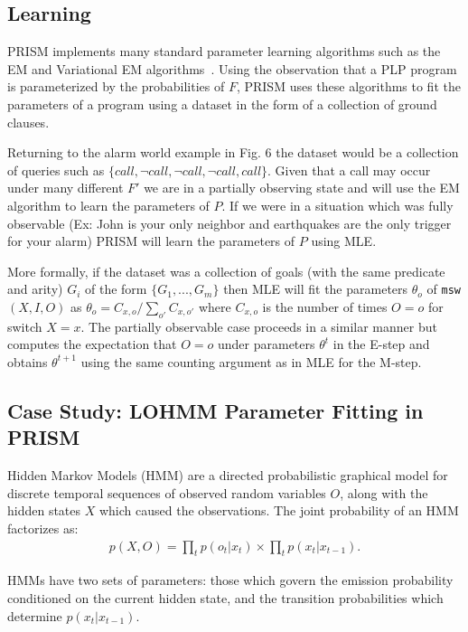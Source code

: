 \documentclass[11pt]{article}
\begin{document}
\subsection{Learning}
PRISM implements many standard parameter learning algorithms such as the EM and Variational EM algorithms~\cite{prism}.  Using the observation that a PLP program is parameterized by the probabilities of $F$, PRISM uses these algorithms to fit the parameters of a program using a dataset in the form of a collection of ground clauses.

Returning to the alarm world example in Fig. 6 the dataset would be a collection of queries such as $\{ call, \neg call, \neg call, \neg call, call\}$.  Given that a call may occur under many different $F'$ we are in a partially observing state and will use the EM algorithm to learn the parameters of $P$.  If we were in a situation which was fully observable (Ex: John is your only neighbor and earthquakes are the only trigger for your alarm) PRISM will learn the parameters of $P$ using MLE.

More formally, if the dataset was a collection of goals (with the same predicate and arity) $G_i$ of the form $\{G_1, ..., G_m\}$ then MLE will fit the parameters $\theta_o$ of \verb!msw!$(X, I, O)$ as $\theta_o = C_{x, o} / \sum_{o'} C_{x, o'}$ where $C_{x, o}$ is the number of times $O = o$ for switch $X = x$.  The partially observable case proceeds in a similar manner but computes the expectation that $O = o$ under parameters $\theta^{t}$ in the E-step and obtains $\theta^{t + 1}$ using the same counting argument as in MLE for the M-step.

\subsection{Case Study: LOHMM Parameter Fitting in PRISM}
Hidden Markov Models (HMM) are a directed probabilistic graphical model for discrete temporal sequences of observed random variables $O$, along with the hidden states $X$ which caused the observations.  The joint probability of an HMM factorizes as:
\begin{gather*}
p(X, O) = \prod_t p(o_t | x_t) \times \prod_t p(x_t | x_{t - 1}).
\end{gather*}

HMMs have two sets of parameters: those which govern the emission probability conditioned on the current hidden state, and the transition probabilities which determine $p(x_t | x_{t - 1})$.
\end{document}

